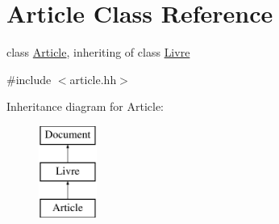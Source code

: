 \hypertarget{classArticle}{
\section{Article Class Reference}
\label{classArticle}
}


class \hyperlink{classArticle}{Article}, inheriting of class \hyperlink{classLivre}{Livre}  




{\ttfamily \#include $<$article.hh$>$}

Inheritance diagram for Article:\begin{figure}[H]
\begin{center}
\leavevmode
\includegraphics[height=3.000000cm]{classArticle}
\end{center}
\end{figure}
